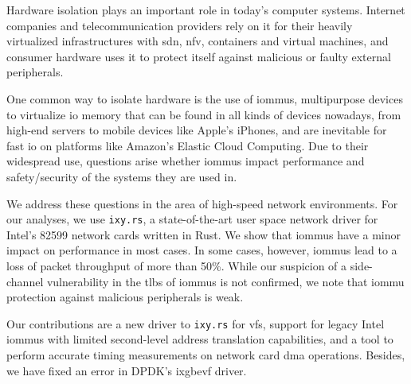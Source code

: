 \small

Hardware isolation plays an important role in today's computer systems.
Internet companies and telecommunication providers rely on it for their heavily
virtualized infrastructures with \acl{sdn}, \acl{nfv}, containers and virtual
machines, and consumer hardware uses it to protect itself against malicious or
faulty external peripherals.

One common way to isolate hardware is the use of \acp{iommu}, multipurpose
devices to virtualize \acs{io} memory that can be found in all kinds of devices
nowadays, from high-end servers to mobile devices like Apple's iPhones, and are
inevitable for fast \ac{io} on platforms like Amazon's Elastic Cloud Computing.
Due to their widespread use, questions arise whether \acp{iommu} impact
performance and safety/security of the systems they are used in.

We address these questions in the area of high-speed network environments. For
our analyses, we use \texttt{ixy.rs}, a state-of-the-art user space network
driver for Intel's 82599 network cards written in Rust. We show that \acp{iommu}
have a minor impact on performance in most cases. In some cases, however,
\acp{iommu} lead to a loss of packet throughput of more than 50\%. While our
suspicion of a side-channel vulnerability in the \aclp{tlb} of \acp{iommu} is
not confirmed, we note that \ac{iommu} protection against malicious peripherals
is weak.

Our contributions are a new driver to \texttt{ixy.rs} for \aclp{vf}, support for
legacy Intel \acp{iommu} with limited second-level address translation
capabilities, and a tool to perform accurate timing measurements on network card
\acs{dma} operations. Besides, we have fixed an error in DPDK's ixgbevf driver.

